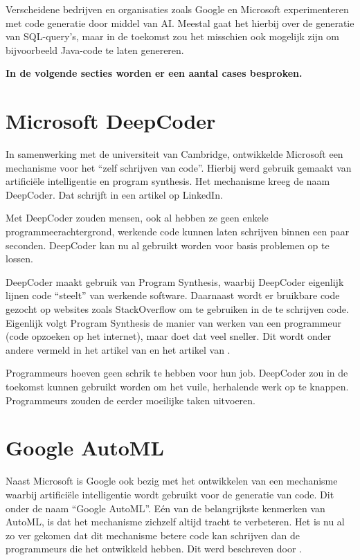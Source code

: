 Verscheidene bedrijven en organisaties zoals Google en Microsoft experimenteren met code generatie door middel van AI. Meestal gaat het hierbij over de generatie van SQL-query's, maar in de toekomst zou het misschien ook mogelijk zijn om bijvoorbeeld Java-code te laten genereren. 

\textbf{In de volgende secties worden er een aantal cases besproken.}
\section{Microsoft DeepCoder}

In samenwerking met de universiteit van Cambridge, ontwikkelde Microsoft een mechanisme voor het “zelf schrijven van code”. Hierbij werd gebruik gemaakt van artificiële intelligentie en program synthesis. Het mechanisme kreeg de naam DeepCoder. Dat schrijft \textcite{DeepCoder} in een artikel op LinkedIn.

Met DeepCoder zouden mensen, ook al hebben ze geen enkele programmeerachtergrond, werkende code kunnen laten schrijven binnen een paar seconden. DeepCoder kan nu al gebruikt worden voor basis problemen op te lossen.

DeepCoder maakt gebruik van Program Synthesis, waarbij DeepCoder eigenlijk lijnen code “steelt” van werkende software. Daarnaast wordt er bruikbare code gezocht op websites zoals StackOverflow om te gebruiken in de te schrijven code. Eigenlijk volgt Program Synthesis de manier van werken van een programmeur (code opzoeken op het internet), maar doet dat veel sneller. Dit wordt onder andere vermeld in het artikel van \textcite{techcrunch} en het artikel van \textcite{NewScientist}.

Programmeurs hoeven geen schrik te hebben voor hun job. DeepCoder zou in de toekomst kunnen gebruikt worden om het vuile, herhalende werk op te knappen. Programmeurs zouden de eerder moeilijke taken uitvoeren.

\section{Google AutoML}

Naast Microsoft is Google ook bezig met het ontwikkelen van een mechanisme waarbij artificiële intelligentie wordt gebruikt voor de generatie van code. Dit onder de naam “Google AutoML”. Eén van de belangrijkste kenmerken van AutoML, is dat het mechanisme zichzelf altijd tracht te verbeteren. Het is nu al zo ver gekomen dat dit mechanisme betere code kan schrijven dan de programmeurs die het ontwikkeld hebben. Dit werd beschreven door \textcite{greene}.


